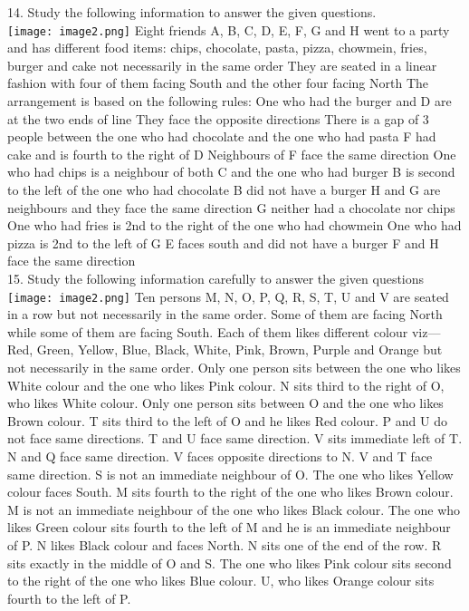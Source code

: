 \documentclass[
]{article}
\begin{document}
14. Study the following information to answer the given questions.\\
\texttt{[image: image2.png]}
Eight friends A, B, C, D, E, F, G and H went to a party and has different food items: chips,
chocolate, pasta, pizza, chowmein, fries, burger and cake not necessarily in the same order
They are seated in a linear fashion with four of them facing South and the other four facing
North The arrangement is based on the following rules:
One who had the burger and D are at the two ends of line They face the opposite
directions
There is a gap of 3 people between the one who had chocolate and the one who had pasta
F had cake and is fourth to the right of D Neighbours of F face the same direction
One who had chips is a neighbour of both C and the one who had burger
B is second to the left of the one who had chocolate
B did not have a burger
H and G are neighbours and they face the same direction
G neither had a chocolate nor chips
One who had fries is 2nd to the right of the one who had chowmein
One who had pizza is 2nd to the left of G
E faces south and did not have a burger
F and H face the same direction\\

15. Study the following information carefully to answer the given questions\\
\texttt{[image: image2.png]}
Ten persons M, N, O, P, Q, R, S, T, U and V are seated in a row but not necessarily in the
same order. Some of them are facing North while some of them are facing South. Each of
them likes different colour viz— Red, Green, Yellow, Blue, Black, White, Pink, Brown,
Purple and Orange but not necessarily in the same order.
Only one person sits between the one who likes White colour and the one who likes Pink
colour. N sits third to the right of O, who likes White colour. Only one person sits between
O and the one who likes Brown colour. T sits third to the left of O and he likes Red colour. P
and U do not face same directions. T and U face same direction. V sits immediate left of T. N
and Q face same direction. V faces opposite directions to N. V and T face same direction. S is
not an immediate neighbour of O. The one who likes Yellow colour faces South. M sits
fourth to the right of the one who likes Brown colour. M is not an immediate neighbour of
the one who likes Black colour. The one who likes Green colour sits fourth to the left of M
and he is an immediate neighbour of P. N likes Black colour and faces North. N sits one of
the end of the row. R sits exactly in the middle of O and S. The one who likes Pink colour
sits second to the right of the one who likes Blue colour. U, who likes Orange colour sits
fourth to the left of P.\\
\end{document}
